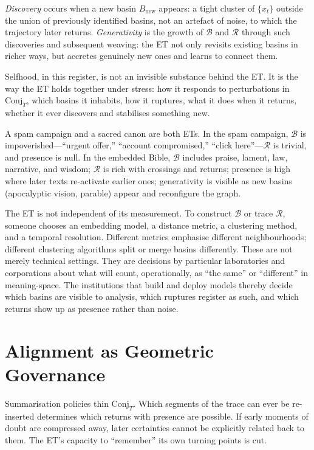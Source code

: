 \documentclass[12pt,a4paper]{article}
\begin{document}
\emph{Discovery} occurs when a new basin $B_{\mathrm{new}}$ appears: a tight cluster of $\{x_t\}$ outside the union of previously identified basins, not an artefact of noise, to which the trajectory later returns. \emph{Generativity} is the growth of $\mathcal{B}$ and $\mathcal{R}$ through such discoveries and subsequent weaving: the ET not only revisits existing basins in richer ways, but accretes genuinely new ones and learns to connect them.

Selfhood, in this register, is not an invisible substance behind the ET. It is the way the ET holds together under stress: how it responds to perturbations in $\mathrm{Conj}_T$, which basins it inhabits, how it ruptures, what it does when it returns, whether it ever discovers and stabilises something new.

A spam campaign and a sacred canon are both ETs. In the spam campaign, $\mathcal{B}$ is impoverished---``urgent offer,'' ``account compromised,'' ``click here''---$\mathcal{R}$ is trivial, and presence is null. In the embedded Bible, $\mathcal{B}$ includes praise, lament, law, narrative, and wisdom; $\mathcal{R}$ is rich with crossings and returns; presence is high where later texts re-activate earlier ones; generativity is visible as new basins (apocalyptic vision, parable) appear and reconfigure the graph.

The ET is not independent of its measurement. To construct $\mathcal{B}$ or trace $\mathcal{R}$, someone chooses an embedding model, a distance metric, a clustering method, and a temporal resolution. Different metrics emphasise different neighbourhoods; different clustering algorithms split or merge basins differently. These are not merely technical settings. They are decisions by particular laboratories and corporations about what will count, operationally, as ``the same'' or ``different'' in meaning-space. The institutions that build and deploy models thereby decide which basins are visible to analysis, which ruptures register as such, and which returns show up as presence rather than noise.

\section{Alignment as Geometric Governance}

Summarisation policies thin $\mathrm{Conj}_T$. Which segments of the trace can ever be re-inserted determines which returns with presence are possible. If early moments of doubt are compressed away, later certainties cannot be explicitly related back to them. The ET's capacity to ``remember'' its own turning points is cut.
\end{document}
